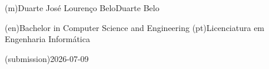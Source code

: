%
%
\ntauthorname(m){Duarte José Lourenço Belo}{Duarte Belo}



%
%
%
\ntauthordegree(en){Bachelor in Computer Science and Engineering}
\ntauthordegree(pt){Licenciatura em Engenharia Informática}



%
%
%

%
%
\ntdate(submission){2026-07-09}



